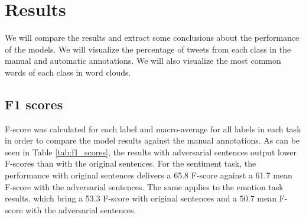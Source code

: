 \documentclass[11pt,a4paper]{article}
\begin{document}
\section{Results}

We will compare the results and extract some conclusions about the performance of the models. We will visualize the percentage of tweets from each class in the manual and automatic annotations. We will also visualize the most common words of each class in word clouds.

\subsection{F1 scores}

F-score was calculated for each label and macro-average for all labels in each task in order to compare the model results against the manual annotations. 
As can be seen in Table \ref{tab:f1_scores}, the results with adversarial sentences output lower F-scores than with the original sentences. For the sentiment task, the performance with original sentences delivers a 65.8 F-score against a 61.7 mean F-score with the adversarial sentences. The same applies to the emotion task results, which bring a 53.3 F-score with original sentences and a 50.7 mean F-score with the adversarial sentences.
\end{document}
